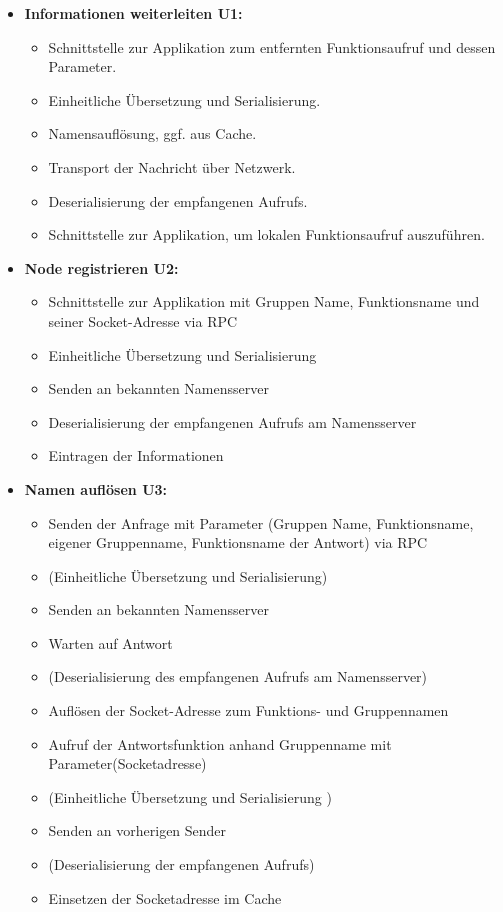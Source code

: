 \begin{itemize}
	\item \textbf{Informationen weiterleiten U1:}\\
	\begin{itemize}
		\item Schnittstelle zur Applikation zum entfernten Funktionsaufruf und dessen Parameter.
		\item Einheitliche Übersetzung und Serialisierung. 
		\item Namensauflösung, ggf. aus Cache.
		\item Transport der Nachricht über Netzwerk. 
		\item Deserialisierung der empfangenen Aufrufs.
		\item Schnittstelle zur Applikation, um lokalen Funktionsaufruf auszuführen.  
	\end{itemize}
	
	\item \textbf{Node registrieren U2:}\\
	\begin{itemize}
		\item Schnittstelle zur Applikation mit Gruppen Name, Funktionsname und seiner Socket-Adresse via RPC
		\item Einheitliche Übersetzung und Serialisierung 
		\item Senden an bekannten Namensserver
		\item Deserialisierung der empfangenen Aufrufs am Namensserver
		\item Eintragen der Informationen
	\end{itemize}
	
	\item \textbf{Namen auflösen U3:}\\
	\begin{itemize}
		\item Senden der Anfrage mit Parameter (Gruppen Name, Funktionsname, eigener Gruppenname, Funktionsname der Antwort) via RPC
		\item (Einheitliche Übersetzung und Serialisierung)
		\item Senden an bekannten Namensserver
		\item Warten auf Antwort
		\item (Deserialisierung des empfangenen Aufrufs am Namensserver)
		\item Auflösen der Socket-Adresse zum Funktions- und Gruppennamen
		\item Aufruf der Antwortsfunktion anhand Gruppenname mit Parameter(Socketadresse)
		\item (Einheitliche Übersetzung und Serialisierung )
		\item Senden an vorherigen Sender
		\item (Deserialisierung der empfangenen Aufrufs)
		\item Einsetzen der Socketadresse im Cache
	\end{itemize}
	

\end{itemize}
